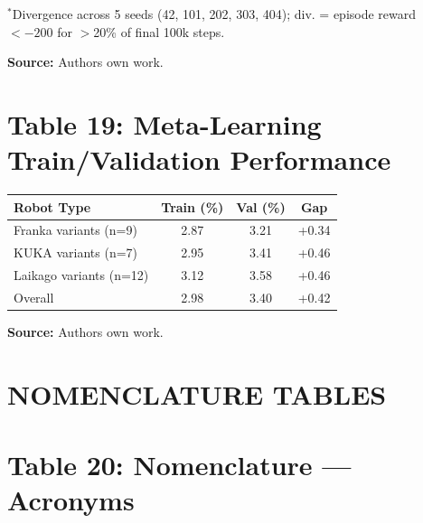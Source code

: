 \documentclass[11pt,a4paper]{article}
\begin{document}
\vspace{0.2cm}

\noindent \footnotesize{$^*$Divergence across 5 seeds (42, 101, 202, 303, 404); div. = episode reward $< -200$ for $>$20\% of final 100k steps.}

\vspace{0.2cm}
\noindent
\normalsize\textbf{Source:} Authors own work.

\raggedright


\section*{Table 19: Meta-Learning Train/Validation Performance}

\centering
\begin{tabular}{@{}lccc@{}}
\hline
\textbf{Robot Type} & \textbf{Train (\%)} & \textbf{Val (\%)} & \textbf{Gap} \\
\hline
Franka variants (n=9) & 2.87 & 3.21 & +0.34 \\
KUKA variants (n=7) & 2.95 & 3.41 & +0.46 \\
Laikago variants (n=12) & 3.12 & 3.58 & +0.46 \\
\hline
Overall & 2.98 & 3.40 & +0.42 \\
\hline
\end{tabular}

\vspace{0.2cm}
\noindent
\normalsize\textbf{Source:} Authors own work.

\raggedright


\newpage
\section*{NOMENCLATURE TABLES}


\section*{Table 20: Nomenclature --- Acronyms}
\end{document}
